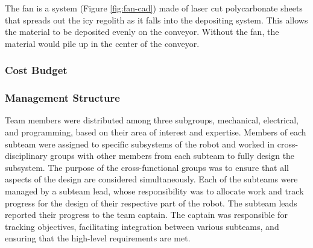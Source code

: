 \documentclass[class=article, crop=false]{standalone}
\begin{document}
	The fan is a system (Figure \ref{fig:fan-cad}) made of laser cut polycarbonate sheets that spreads out the icy regolith as it falls into the depositing system. This allows the material to be deposited evenly on the conveyor. Without the fan, the material would pile up in the center of the conveyor. 
	
	
	\subsubsection{Cost Budget}
	
	\subsubsection{Management Structure}
	Team members were distributed among three subgroups, mechanical, electrical, and programming, based on their area of interest and expertise. Members of each subteam were assigned to specific subsystems of the robot and worked in cross-disciplinary groups with other members from each subteam to fully design the subsystem. The purpose of the cross-functional groups was to ensure that all aspects of the design are considered simultaneously. Each of the subteams were managed by a subteam lead, whose responsibility was to allocate work and track progress for the design of their respective part of the robot. The subteam leads reported their progress to the team captain. The captain was responsible for tracking objectives, facilitating integration between various subteams, and ensuring that the high-level requirements are met.



	
	
	


	
\end{document}
